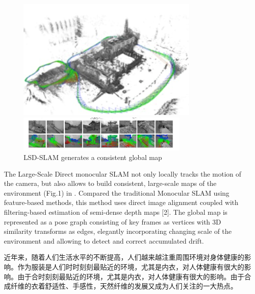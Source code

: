 \begin{figure}
  \centering
  \includegraphics[height=0.5\textwidth]{figures/Fig1(1)}
  
  \centering
  \includegraphics[width=0.75\textwidth]{figures/Fig1(2)}
  \caption{LSD-SLAM generates a consistent global map}
\end{figure}

The Large-Scale Direct monocular SLAM not only locally tracks the motion of the camera, but also allows to build consistent, large-scale maps of the environment (Fig.1) in \upcite{[1]} . Compared the traditional Monocular SLAM using feature-based methods, this method uses direct image alignment coupled with filtering-based estimation of semi-dense depth maps [2]. The global map is represented as a pose graph consisting of key frames as vertices with 3D similarity transforms as edges, elegantly incorporating changing scale of the environment and allowing to detect and correct accumulated drift.






\iffalse

近年来，随着人们生活水平的不断提高，人们越来越注重周围环境对身体健康的影响。作为服装是人们时时刻刻最贴近的环境，尤其是内衣，对人体健康有很大的影响。由于合时刻刻最贴近的环境，尤其是内衣，对人体健康有很大的影响。由于合成纤维的衣着舒适性、手感性，天然纤维的发展又成为人们关注的一大热点。

